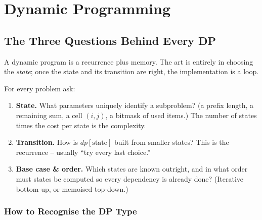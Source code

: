 \chapter{Dynamic Programming}

\section{The Three Questions Behind Every DP}
\label{sec:cses-dp-intro}

A dynamic program is a recurrence plus memory. The art is entirely in
choosing the \emph{state}; once the state and its transition are right,
the implementation is a loop.

\begin{ideabox}
For every problem ask:
\begin{enumerate}
  \item \textbf{State.} What parameters uniquely identify a subproblem?
        (a prefix length, a remaining sum, a cell $(i,j)$, a bitmask of
        used items.) The number of states times the cost per state is
        the complexity.
  \item \textbf{Transition.} How is $\textit{dp}[\text{state}]$ built
        from smaller states? This is the recurrence -- usually ``try
        every last choice.''
  \item \textbf{Base case \& order.} Which states are known outright,
        and in what order must states be computed so every dependency is
        already done? (Iterative bottom-up, or memoised top-down.)
\end{enumerate}
\end{ideabox}

\subsection*{How to Recognise the DP Type}

